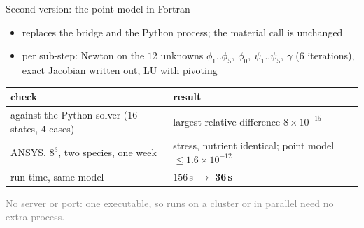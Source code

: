\documentclass[aspectratio=169,11pt]{beamer}
\begin{document}
\begin{frame}{Second version: the point model in Fortran}
\centering
{}

\vspace{8pt}
\small
\begin{itemize}
  \item replaces the bridge and the Python process; the material call is unchanged
  \item per sub-step: Newton on the $12$ unknowns $\phi_1..\phi_5,\ \phi_0,\ \psi_1..\psi_5,\ \gamma$
        ($6$ iterations), exact Jacobian written out, LU with pivoting
\end{itemize}

\vspace{4pt}
\footnotesize
\begin{tabular}{@{}ll@{}}
\toprule
\textbf{check} & \textbf{result}\\
\midrule
against the Python solver ($16$ states, $4$ cases) & largest relative difference $8\times10^{-15}$\\
ANSYS, $8^3$, two species, one week & stress, nutrient identical; point model $\le1.6\times10^{-12}$\\
run time, same model & $156$\,s $\to$ \textbf{36\,s}\\
\bottomrule
\end{tabular}

\vspace{6pt}
\footnotesize\textcolor{gray}{No server or port: one executable, so runs on a cluster or in parallel need no extra process.}
\end{frame}
\end{document}
